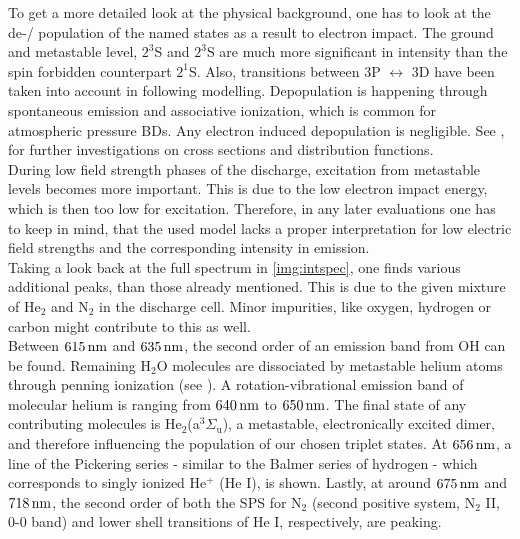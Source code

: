 \documentclass[a4paper,10pt,twoside]{article}
\newcommand{\ix}[1]{_\text{#1}}
\begin{document}
			To get a more detailed look at the physical background, one has to look at the de-/ population of the named states as a result to electron impact. The ground and metastable level, $2^3$S and $2^3$S are much more significant in intensity than the spin forbidden counterpart $2^1$S. Also, transitions between 3P $\leftrightarrow$ 3D have been taken into account in following modelling. Depopulation is happening through spontaneous emission and associative ionization, which is common for atmospheric pressure BDs. Any electron induced depopulation is negligible. See \cite{PhysRevA.21.188}, \cite{0963-0252-14-4-011} for further investigations on cross sections and distribution functions.\\
			During low field strength phases of the discharge, excitation from metastable levels becomes more important. This is due to the low electron impact energy, which is then too low for excitation. Therefore, in any later evaluations one has to keep in mind, that the used model lacks a proper interpretation for low electric field strengths and the corresponding intensity in emission.\\
			Taking a look back at the full spectrum in \autoref{img:intspec}, one finds various additional peaks, than those already mentioned. This is due to the given mixture of He$_2$ and N$_2$ in the discharge cell. Minor impurities, like oxygen, hydrogen or carbon might contribute to this as well.\\
			Between $\unit[615]{nm}$ and $\unit[635]{nm}$, the second order of an emission band from OH can be found. Remaining H$\ix{2}$O molecules are dissociated by metastable helium atoms through penning ionization (see \cite{brandenburg2004raeumlich}). A rotation-vibrational emission band of molecular helium is ranging from $\unit[640]{nm}$ to $\unit[650]{nm}$. The final state of any contributing molecules is He$\ix{2}$(a$^{3}\Sigma\ix{u}$), a metastable, electronically excited dimer, and therefore influencing the population of our chosen triplet states. At $\unit[656]{nm}$, a line of the Pickering series - similar to the Balmer series of hydrogen - which corresponds to singly ionized He$^+$ (He I), is shown. Lastly, at around $\unit[675]{nm}$ and $\unit[718]{nm}$, the second order of both the SPS for N$\ix{2}$ (second positive system, N$\ix{2}$ II, 0-0 band) and lower shell transitions of He I, respectively, are peaking.
			
			
		
\end{document}
